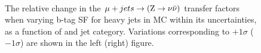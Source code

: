 \begin{figure}[!h]
  \centering
   ~~
  \\

  \caption{\label{fig:tfSyst_bsf_muToZinv} The relative change in the
  $\mu + jets \rightarrow ({\text Z} \rightarrow \nu\bar{\nu})$ transfer
  factors when varying b-tag SF for heavy jets in MC within its uncertainties, as a function of \scalht and jet category. 
  Variations corresponding to $+1\sigma$ ($-1\sigma$) are shown in the left (right) figure. 
  }
\end{figure}

